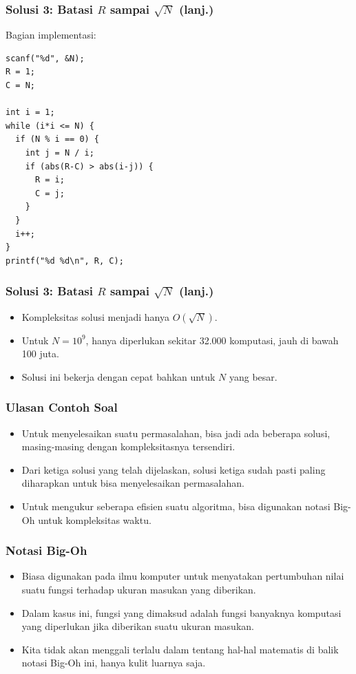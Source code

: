 \begin{frame}[fragile]
\frametitle{Solusi 3: Batasi $R$ sampai $\sqrt{N}$ (lanj.)}
Bagian implementasi:
\begin{lstlisting}
scanf("%d", &N);
R = 1;
C = N;

int i = 1;
while (i*i <= N) {
  if (N % i == 0) {
    int j = N / i;
    if (abs(R-C) > abs(i-j)) {
      R = i;
      C = j;
    }
  }
  i++;
}
printf("%d %d\n", R, C);
\end{lstlisting}
\end{frame}

\begin{frame}[fragile]
\frametitle{Solusi 3: Batasi $R$ sampai $\sqrt{N}$ (lanj.)}
\begin{itemize}
  \item Kompleksitas solusi menjadi hanya $O(\sqrt{N})$.
  \item Untuk $N = 10^9$, hanya diperlukan sekitar 32.000 komputasi, jauh di bawah 100 juta.
  \item Solusi ini bekerja dengan cepat bahkan untuk $N$ yang besar.
\end{itemize}
\end{frame}

\begin{frame}
\frametitle{Ulasan Contoh Soal}
\begin{itemize}
  \item Untuk menyelesaikan suatu permasalahan, bisa jadi ada beberapa solusi, masing-masing dengan kompleksitasnya tersendiri.
  \item Dari ketiga solusi yang telah dijelaskan, solusi ketiga sudah pasti paling diharapkan untuk bisa menyelesaikan permasalahan.
  \item Untuk mengukur seberapa efisien suatu algoritma, bisa digunakan notasi Big-Oh untuk kompleksitas waktu.
\end{itemize}
\end{frame}

\begin{frame}
\frametitle{Notasi Big-Oh}
\begin{itemize}
  \item Biasa digunakan pada ilmu komputer untuk menyatakan pertumbuhan nilai suatu fungsi terhadap ukuran masukan yang diberikan.
  \item Dalam kasus ini, fungsi yang dimaksud adalah fungsi banyaknya komputasi yang diperlukan jika diberikan suatu ukuran masukan.
  \item Kita tidak akan menggali terlalu dalam tentang hal-hal matematis di balik notasi Big-Oh ini, hanya kulit luarnya saja.
\end{itemize}
\end{frame}

